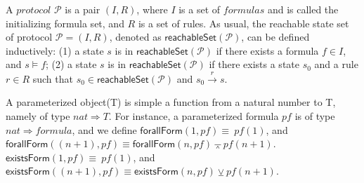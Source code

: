 \documentclass[final]{IEEEtran}
\def \andc {\barwedge }
\def \orc {\veebar }
\begin{document}
A $protocol$ $\mathcal{P}$ is a pair $(I,R)$, where $I$ is a set of $formulas$ and is called the initializing formula  set, and $R$ is a set of rules. %
 As usual, the reachable state set of protocol  $\mathcal{P}=(I,R)$, denoted as $\mathsf{reachableSet}(\mathcal{P})$, can be defined inductively: (1) a state $s$ is in
$\mathsf{reachableSet}(\mathcal{P})$ if there exists a formula $f \in I$, and $s \models  f$; (2) a state $s$ is in
$\mathsf{reachableSet}(\mathcal{P})$ if there exists a  state $s_0$  and a rule $r \in R$ such that $s_0 \in \mathsf{reachableSet}(\mathcal{P})$ and $s_0\overset{r}{\rightarrow } s$.

A parameterized object(T) is simple a function from a natural number to T, namely of type $nat \Rightarrow T$. For instance, a parameterized formula $pf$ is of type $nat \Rightarrow formula$, and we define
$\mathsf{forallForm}(1,pf)\equiv~pf(1)$, and $\mathsf{forallForm}((n+1),pf)\equiv\mathsf{forallForm}(n,pf) \andc pf(n +1)$. $\mathsf{existsForm}(1,pf)\equiv~pf(1)$, and $\mathsf{existsForm}((n+1),pf)\equiv\mathsf{existsForm}(n,pf) \orc pf(n +1)$.
\end{document}

